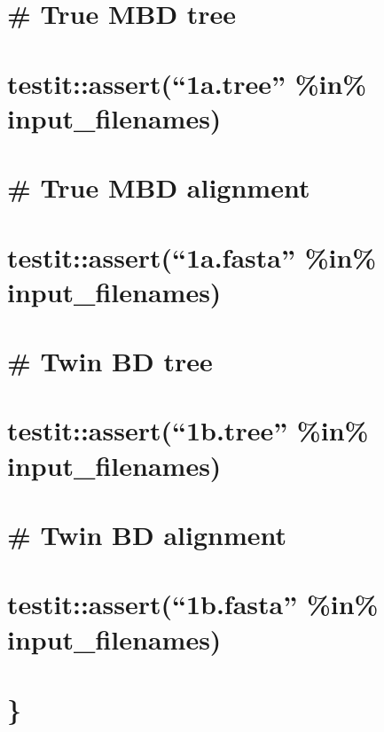 \documentclass[]{article}
\begin{document}
\section{\# True MBD tree}\label{true-mbd-tree}

\section{\texorpdfstring{testit::assert(``1a.tree'' \%in\%
input\_filenames)}{testit::assert(1a.tree \%in\% input\_filenames)}}\label{testitassert1a.tree-in-input_filenames}

\section{\# True MBD alignment}\label{true-mbd-alignment}

\section{\texorpdfstring{testit::assert(``1a.fasta'' \%in\%
input\_filenames)}{testit::assert(1a.fasta \%in\% input\_filenames)}}\label{testitassert1a.fasta-in-input_filenames}

\section{\# Twin BD tree}\label{twin-bd-tree}

\section{\texorpdfstring{testit::assert(``1b.tree'' \%in\%
input\_filenames)}{testit::assert(1b.tree \%in\% input\_filenames)}}\label{testitassert1b.tree-in-input_filenames}

\section{\# Twin BD alignment}\label{twin-bd-alignment}

\section{\texorpdfstring{testit::assert(``1b.fasta'' \%in\%
input\_filenames)}{testit::assert(1b.fasta \%in\% input\_filenames)}}\label{testitassert1b.fasta-in-input_filenames}

\section{\}}\label{section-1}
\end{document}
